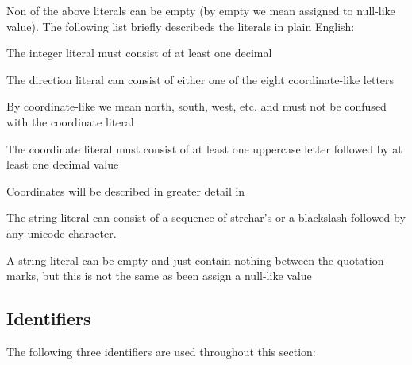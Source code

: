 \begin{ebnf}
\end{ebnf}

Non of the above literals can be empty (by empty we mean assigned to null-like value). The following list briefly describeds the literals in plain English:

\begin{dlist}
\item The integer literal must consist of at least one decimal
\item The direction literal can consist of either one of the eight coordinate-like letters 
\begin{dlist}
\item By coordinate-like we mean north, south, west, etc. and must not be confused with the coordinate literal
\end{dlist}
\item The coordinate literal must consist of at least one uppercase letter followed by at least one decimal value
\begin{dlist}
\item Coordinates will be described in greater detail in 
\end{dlist}
\item The string literal can consist of a sequence of strchar's or a blackslash followed by any unicode character.
\begin{dlist}
\item A string literal can be empty and just contain nothing between the quotation marks, but this is not the same as been assign a null-like value
\end{dlist}
\end{dlist}

\subsection{Identifiers}
The following three identifiers are used throughout this section:

\begin{ebnf}
\end{ebnf}

